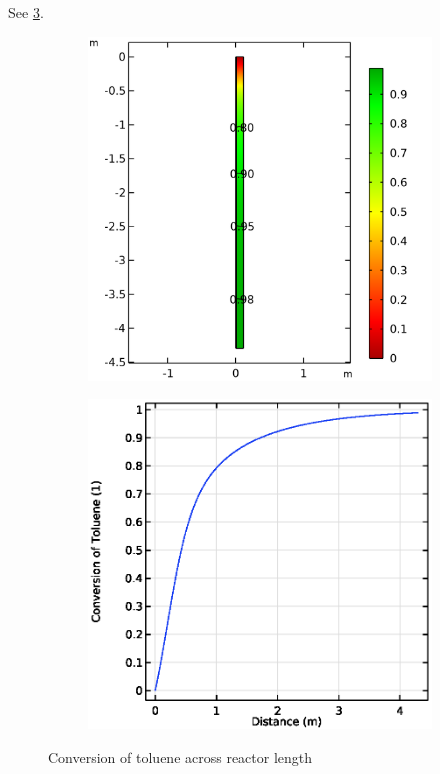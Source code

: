 See \cref{fig:comsol-conversion}.

\begin{figure}[h]
    \centering

    \begin{subfigure}{0.49\linewidth}
        \includegraphics[width=\linewidth, scale=0.5]{figures/conversion-surface.png}
        \label{fig:comsol-conversion:surface}
    \end{subfigure}
    \begin{subfigure}{0.49\linewidth}
        \includegraphics[width=\linewidth, scale=0.5]{figures/conversion-line.eps}
        \label{fig:comsol-conversion:line}
    \end{subfigure}

    \caption{Conversion of toluene across reactor length}
    \label{fig:comsol-conversion}
\end{figure}

